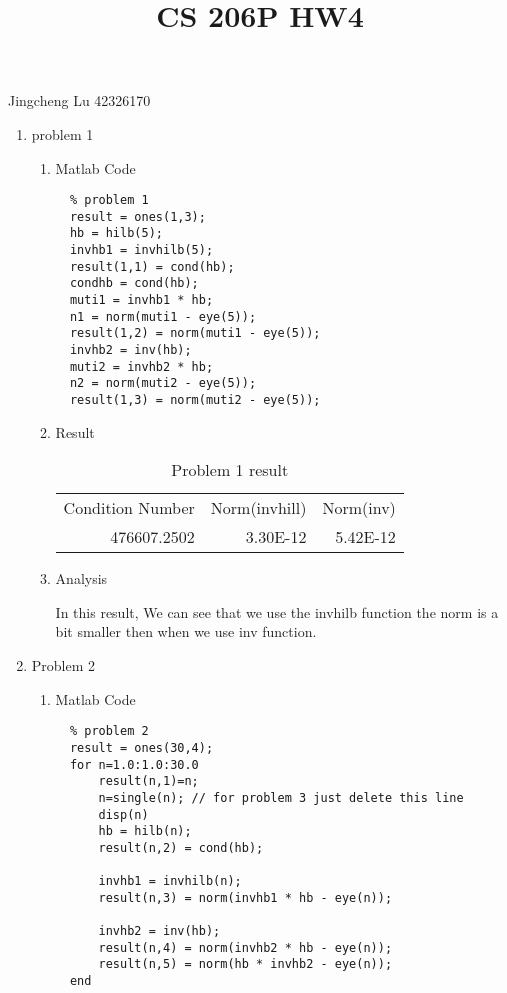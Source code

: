 \documentclass[12pt]{article}
\title{CS 206P HW4}
\begin{document}
Jingcheng Lu  42326170  

\hrulefill

\begin{enumerate}
\item problem 1
  \begin{enumerate}
  \item Matlab Code
  
  \begin{lstlisting}
  % problem 1
  result = ones(1,3);
  hb = hilb(5);
  invhb1 = invhilb(5);
  result(1,1) = cond(hb);
  condhb = cond(hb);
  muti1 = invhb1 * hb;
  n1 = norm(muti1 - eye(5));
  result(1,2) = norm(muti1 - eye(5));
  invhb2 = inv(hb);
  muti2 = invhb2 * hb;
  n2 = norm(muti2 - eye(5));
  result(1,3) = norm(muti2 - eye(5));
  \end{lstlisting}

  \item Result
  
\begin{table}[htbp]
  \centering
  \caption{Problem 1 result}
    \begin{tabular}{rrr}
    \multicolumn{1}{l}{Condition Number} & \multicolumn{1}{l}{Norm(invhill)} & \multicolumn{1}{l}{Norm(inv)} \\
    476607.2502 & 3.30E-12 & 5.42E-12 \\
    \end{tabular}%
  \label{tab:addlabel}%
\end{table}%

  \item Analysis

   In this result, We can see that we use the invhilb function the norm is a bit smaller then when we use inv function.
   
  \end{enumerate}
  
\item Problem 2
  \begin{enumerate}
  \item Matlab Code
  \begin{lstlisting}
  % problem 2
  result = ones(30,4);
  for n=1.0:1.0:30.0
      result(n,1)=n;
      n=single(n); // for problem 3 just delete this line
      disp(n)
      hb = hilb(n);
      result(n,2) = cond(hb);

      invhb1 = invhilb(n);
      result(n,3) = norm(invhb1 * hb - eye(n));

      invhb2 = inv(hb);
      result(n,4) = norm(invhb2 * hb - eye(n));
      result(n,5) = norm(hb * invhb2 - eye(n));
  end
  \end{lstlisting}


\end{enumerate}
\end{enumerate}
\end{document}

